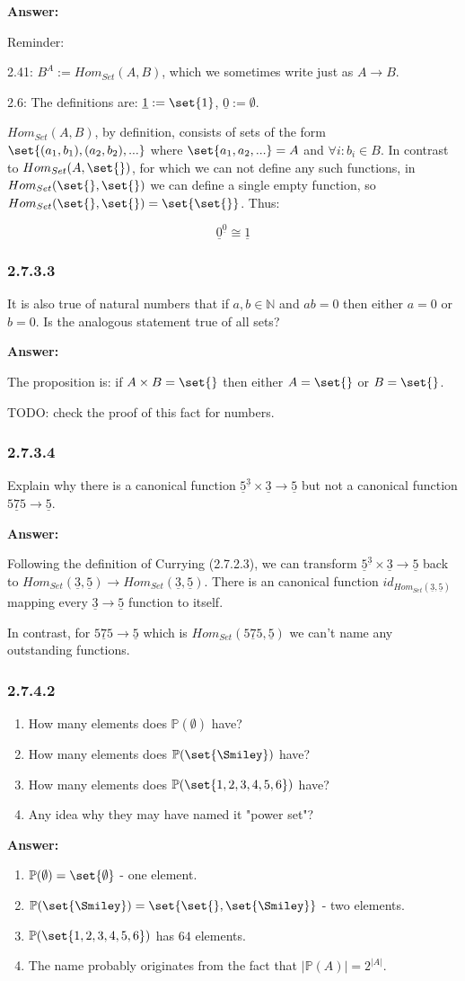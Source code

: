 \documentclass{article}
\newcommand{\N}{\mathbb{N}}
\newcommand{\Pow}{\mathbb{P}}
\newcommand{\vsp}[0]{\vspace*{10pt}\par}
\newcommand{\exercise}[1]{\subsubsection*{#1}}
\newcommand{\ans}[0]{\vsp\textbf{Answer: }\vsp}
\newcommand{\U}[1]{{\underline{#1}}}
\newcommand{\ei}{\item}
\newcommand{\eb}{\begin{enumerate}[label=(\alph*)]\ei}
\newcommand{\ee}{\end{enumerate}}
\begin{document}
\ans

Reminder:

2.41: $B^A := Hom_{Set}(A,B)$, which we sometimes write just as $A \to B$.

2.6: The definitions are: $\underline{1} := \set{1}$, $\underline{0} := \emptyset$.

\vsp

$Hom_{Set}(A,B)$, by definition, consists of sets of the form
$\set{(a_1,b_1),(a_2,b_2),...}$ where $\set{a_1, a_2, ...} = A$ and $\forall i:
b_i \in B$.  In contrast to $Hom_{Set}(A,\set{})$, for which we can not define
any such functions, in $Hom_{Set}(\set{}, \set{})$ we can define a single empty
function, so $Hom_{Set}(\set{}, \set{}) = \set{\set{}}$. Thus:

\[
  \underline{0}^{\underline{0}} \cong \underline{1}
\]

\exercise{2.7.3.3}

It is also true of natural numbers that if $a, b \in \N$ and $ab = 0$ then either
$a = 0$ or $b = 0$. Is the analogous statement true of all sets?

\ans

The proposition is: if $A \times B = \set{}$ then either $A = \set{}$ or $B = \set{}$.

TODO: check the proof of this fact for numbers.

\exercise{2.7.3.4}

Explain why there is a canonical function $\U{5}^\U{3} \times \U{3} \to \U{5}$ but not a
canonical function $\U{575} \to \U{5}$.

\ans

Following the definition of Currying (2.7.2.3), we can transform $\U{5}^\U{3}
\times \U{3} \to \U{5}$ back to $Hom_{Set}(\U{3},\U{5}) \to
Hom_{Set}(\U{3},\U{5})$.  There is an canonical function
$id_{Hom_{Set}(\U{3},\U{5})}$ mapping every $\U{3} \to \U{5}$ function to
itself.

In contrast, for $\U{575} \to \U{5}$ which is $Hom_{Set}(\U{575},\U{5})$ we
can't name any outstanding functions.

\exercise{2.7.4.2}

\eb How many elements does $\Pow(\emptyset)$ have?
\ei How many elements does $\Pow(\set{\Smiley})$ have?
\ei How many elements does $\Pow(\set{1, 2, 3, 4, 5, 6})$ have?
\ei Any idea why they may have named it "power set"?
\ee

\ans

\eb $\Pow(\emptyset) = \set{\emptyset}$ - one element.
\ei $\Pow(\set{\Smiley}) = \set{\set{}, \set{\Smiley}}$ - two elements.
\ei $\Pow(\set{1, 2, 3, 4, 5, 6})$ has $64$ elements.
\ei The name probably originates from the fact that $|\Pow(A)| = 2^{|A|}$.
\ee
\end{document}
